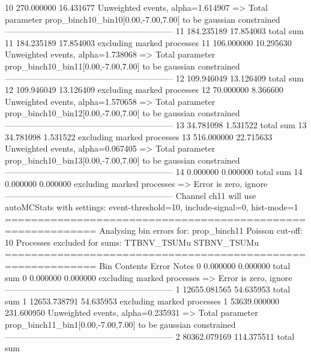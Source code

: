 10         270.000000      16.431677       Unweighted events, alpha=1.614907
  => Total parameter prop_binch10_bin10[0.00,-7.00,7.00] to be gaussian constrained
------------------------------------------------------------
11         184.235189      17.854003       total sum                     
11         184.235189      17.854003       excluding marked processes    
11         106.000000      10.295630       Unweighted events, alpha=1.738068
  => Total parameter prop_binch10_bin11[0.00,-7.00,7.00] to be gaussian constrained
------------------------------------------------------------
12         109.946049      13.126409       total sum                     
12         109.946049      13.126409       excluding marked processes    
12         70.000000       8.366600        Unweighted events, alpha=1.570658
  => Total parameter prop_binch10_bin12[0.00,-7.00,7.00] to be gaussian constrained
------------------------------------------------------------
13         34.781098       1.531522        total sum                     
13         34.781098       1.531522        excluding marked processes    
13         516.000000      22.715633       Unweighted events, alpha=0.067405
  => Total parameter prop_binch10_bin13[0.00,-7.00,7.00] to be gaussian constrained
------------------------------------------------------------
14         0.000000        0.000000        total sum                     
14         0.000000        0.000000        excluding marked processes    
  => Error is zero, ignore      
------------------------------------------------------------
Channel ch11 will use autoMCStats with settings: event-threshold=10, include-signal=0, hist-mode=1
============================================================
Analysing bin errors for: prop_binch11
Poisson cut-off: 10
Processes excluded for sums: TTBNV_TSUMu STBNV_TSUMu
============================================================
Bin        Contents        Error           Notes                         
0          0.000000        0.000000        total sum                     
0          0.000000        0.000000        excluding marked processes    
  => Error is zero, ignore      
------------------------------------------------------------
1          12655.081565    54.635953       total sum                     
1          12653.738791    54.635953       excluding marked processes    
1          53639.000000    231.600950      Unweighted events, alpha=0.235931
  => Total parameter prop_binch11_bin1[0.00,-7.00,7.00] to be gaussian constrained
------------------------------------------------------------
2          80362.079169    114.375511      total sum                     
